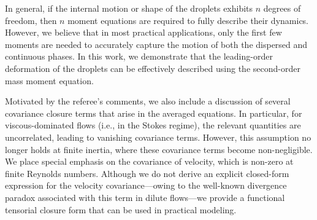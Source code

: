\documentclass[10pt,a4paper]{article}
\newcommand{\tb}[1]{\color{blue}#1\color{black}}
\begin{document}
\begin{enumerate}
    \tb{

In general, if the internal motion or shape of the droplets exhibits $n$ degrees of freedom, then $n$ moment equations are required to fully describe their dynamics. 
However, we believe that in most practical applications, only the first few moments are needed to accurately capture the motion of both the dispersed and continuous phases.
In this work, we demonstrate that the leading-order deformation of the droplets can be effectively described using the second-order mass moment equation. 

Motivated by the referee's comments, we also include a discussion of several covariance closure terms that arise in the averaged equations.
In particular, for viscous-dominated flows (i.e., in the Stokes regime), the relevant quantities are uncorrelated, leading to vanishing covariance terms. 
However, this assumption no longer holds at finite inertia, where these covariance terms become non-negligible. 
We place special emphasis on the covariance of velocity, which is non-zero at finite Reynolds numbers.
Although we do not derive an explicit closed-form expression for the velocity covariance—owing to the well-known divergence paradox associated with this term in dilute flows—we provide a functional tensorial closure form that can be used in practical modeling.

}
\end{enumerate}
\end{document}
